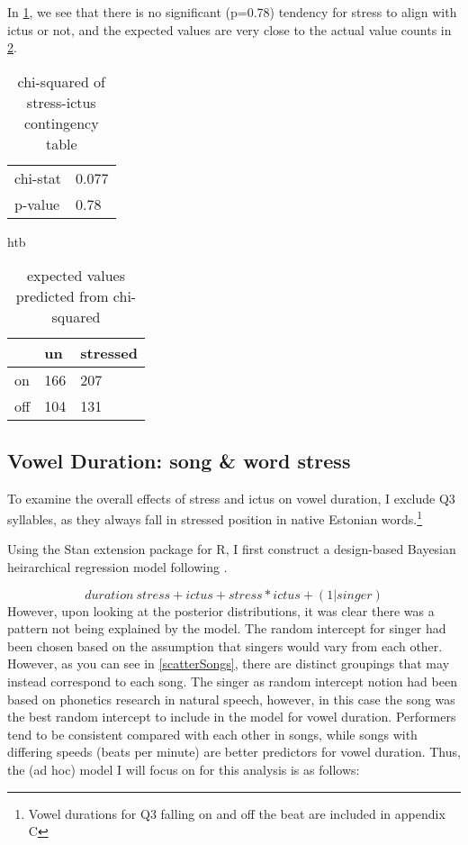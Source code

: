 In \ref{chicont}, we see that there is no significant (p=0.78) tendency for stress to align with ictus or not,  and the expected values are very close to the actual value counts in \ref{chipredict}.


\begin{table}[htb]
\caption{chi-squared of stress-ictus contingency table}
\begin{center}
\begin{tabular}{ll}
\hline
chi-stat & 0.077 \\
p-value &  0.78 \\
\hline
\end{tabular}
\end{center}
\label{chicont}
\end{table}%


\begin{table}{htb}
\caption{expected values predicted from chi-squared}
\centering
\begin{tabular}{lll}
\hline
 				& un 		&   stressed \\
\hline
on	& 166 	& 207 \\
off   				&   104	 & 131 \\
\hline
\end{tabular}
\label{chipredict}
\end{table}



\subsection{Vowel Duration: song \& word stress} 
To examine the overall effects of stress and ictus on vowel duration, I exclude Q3 syllables, as they always fall in stressed position in native Estonian words.\footnote{Vowel durations for Q3 falling on and off the beat are included in appendix C} 

Using the \citep{goodrichRstanarmBayesianApplied2020} Stan extension package for R, I first construct a design-based Bayesian heirarchical regression model following \cite{heirarchyOne}. 

\begin{equation}
duration ~ stress + ictus + stress*ictus + (1|singer)
\end{equation} 
However, upon looking at the posterior distributions, it was clear there was a pattern not being explained by the model. The random intercept for singer had been chosen based on the assumption that singers would vary from each other. However, as you can see in \ref{scatterSongs}, there are distinct groupings that may instead correspond to each song. The singer as random intercept notion had been based on phonetics research in natural speech, however, in this case the song was the best random intercept to include in the model for vowel duration. Performers tend to be consistent compared with each other in songs, while songs with differing speeds (beats per minute) are better predictors for vowel duration. Thus, the (ad hoc) model I will focus on for this analysis is as follows: 

